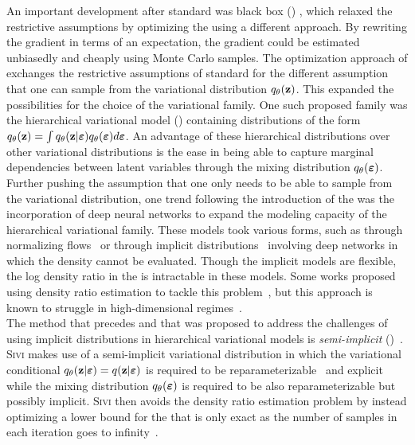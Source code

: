 \documentclass[10pt]{article}
\begin{document}
An important development after standard \vi was black box \vi (\bbvi) \citep{Ranganath:2014}, which relaxed the restrictive assumptions by optimizing the \elbo using a different approach. By rewriting the \elbo gradient in terms of an expectation, the gradient could be estimated unbiasedly and cheaply using Monte Carlo samples. The optimization approach of \bbvi exchanges the restrictive assumptions of standard \vi for the different assumption that one can sample from the variational distribution $q_\theta(\mathbf{z})$. This expanded the possibilities for the choice of the variational family. One such proposed family was the hierarchical variational model (\hvm) \citep{Ranganath:2016} containing distributions of the form $q_\theta(\mathbf{z}) = \int q_\theta(\mathbf{z}|\bm{\varepsilon})q_\theta(\bm{\varepsilon})d\bm{\varepsilon}$. An advantage of these hierarchical distributions over other variational distributions is the ease in being able to capture marginal dependencies between latent variables through the mixing distribution $q_\theta(\bm{\varepsilon})$.
\\

Further pushing the assumption that one only needs to be able to sample from the variational distribution, one trend following the introduction of the \hvm was the incorporation of deep neural networks to expand the modeling capacity of the hierarchical variational family. These models took various forms, such as through normalizing flows~\citep{Rezende:2015} or through implicit distributions~\citep{Mohamed:2016} involving deep networks in which the density cannot be evaluated. Though the implicit models are flexible, the log density ratio in the \elbo is intractable in these models. Some works proposed using density ratio estimation to tackle this problem~\citep[e.g.,][]{Mohamed:2016,Huszar:2017}, but this approach is known to struggle in high-dimensional regimes~\citep{Sugiyama:2012}.
\\

The method that precedes \uivi and that was proposed to address the challenges of using implicit distributions in hierarchical variational models is \textit{semi-implicit} \vi (\sivi)~\citep{Yin:2018}. \textsc{Sivi} makes use of a semi-implicit variational distribution in which the variational conditional $q_\theta(\mathbf{z}|\bm{\varepsilon})=q(\mathbf{z}|\bm{\varepsilon})$ is required to be reparameterizable~\citep{Kingma:2013} and explicit while the mixing distribution $q_\theta(\bm{\varepsilon})$ is required to be also reparameterizable but possibly implicit. \textsc{Sivi} then avoids the density ratio estimation problem by instead optimizing a lower bound for the \elbo that is only exact as the number of samples in each iteration goes to infinity~\citep{Yin:2018,Molchanov:2019}.
\end{document}
